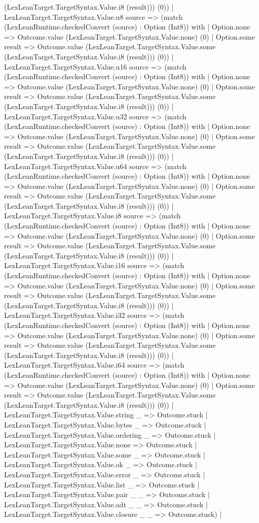\documentclass[11pt]{article}
\begin{document}
(LexLeanTarget.TargetSyntax.Value.i8 (result))) (0)) | LexLeanTarget.TargetSyntax.Value.u8 source => (match (LexLeanRuntime.checkedConvert (source) : Option (Int8)) with | Option.none => Outcome.value (LexLeanTarget.TargetSyntax.Value.none) (0) | Option.some result => Outcome.value (LexLeanTarget.TargetSyntax.Value.some (LexLeanTarget.TargetSyntax.Value.i8 (result))) (0)) | LexLeanTarget.TargetSyntax.Value.u16 source => (match (LexLeanRuntime.checkedConvert (source) : Option (Int8)) with | Option.none => Outcome.value (LexLeanTarget.TargetSyntax.Value.none) (0) | Option.some result => Outcome.value (LexLeanTarget.TargetSyntax.Value.some (LexLeanTarget.TargetSyntax.Value.i8 (result))) (0)) | LexLeanTarget.TargetSyntax.Value.u32 source => (match (LexLeanRuntime.checkedConvert (source) : Option (Int8)) with | Option.none => Outcome.value (LexLeanTarget.TargetSyntax.Value.none) (0) | Option.some result => Outcome.value (LexLeanTarget.TargetSyntax.Value.some (LexLeanTarget.TargetSyntax.Value.i8 (result))) (0)) | LexLeanTarget.TargetSyntax.Value.u64 source => (match (LexLeanRuntime.checkedConvert (source) : Option (Int8)) with | Option.none => Outcome.value (LexLeanTarget.TargetSyntax.Value.none) (0) | Option.some result => Outcome.value (LexLeanTarget.TargetSyntax.Value.some (LexLeanTarget.TargetSyntax.Value.i8 (result))) (0)) | LexLeanTarget.TargetSyntax.Value.i8 source => (match (LexLeanRuntime.checkedConvert (source) : Option (Int8)) with | Option.none => Outcome.value (LexLeanTarget.TargetSyntax.Value.none) (0) | Option.some result => Outcome.value (LexLeanTarget.TargetSyntax.Value.some (LexLeanTarget.TargetSyntax.Value.i8 (result))) (0)) | LexLeanTarget.TargetSyntax.Value.i16 source => (match (LexLeanRuntime.checkedConvert (source) : Option (Int8)) with | Option.none => Outcome.value (LexLeanTarget.TargetSyntax.Value.none) (0) | Option.some result => Outcome.value (LexLeanTarget.TargetSyntax.Value.some (LexLeanTarget.TargetSyntax.Value.i8 (result))) (0)) | LexLeanTarget.TargetSyntax.Value.i32 source => (match (LexLeanRuntime.checkedConvert (source) : Option (Int8)) with | Option.none => Outcome.value (LexLeanTarget.TargetSyntax.Value.none) (0) | Option.some result => Outcome.value (LexLeanTarget.TargetSyntax.Value.some (LexLeanTarget.TargetSyntax.Value.i8 (result))) (0)) | LexLeanTarget.TargetSyntax.Value.i64 source => (match (LexLeanRuntime.checkedConvert (source) : Option (Int8)) with | Option.none => Outcome.value (LexLeanTarget.TargetSyntax.Value.none) (0) | Option.some result => Outcome.value (LexLeanTarget.TargetSyntax.Value.some (LexLeanTarget.TargetSyntax.Value.i8 (result))) (0)) | LexLeanTarget.TargetSyntax.Value.string \_ => Outcome.stuck | LexLeanTarget.TargetSyntax.Value.bytes \_ => Outcome.stuck | LexLeanTarget.TargetSyntax.Value.ordering \_ => Outcome.stuck | LexLeanTarget.TargetSyntax.Value.none => Outcome.stuck | LexLeanTarget.TargetSyntax.Value.some \_ => Outcome.stuck | LexLeanTarget.TargetSyntax.Value.ok \_ => Outcome.stuck | LexLeanTarget.TargetSyntax.Value.error \_ => Outcome.stuck | LexLeanTarget.TargetSyntax.Value.list \_ => Outcome.stuck | LexLeanTarget.TargetSyntax.Value.pair \_ \_ => Outcome.stuck | LexLeanTarget.TargetSyntax.Value.adt \_ \_ => Outcome.stuck | LexLeanTarget.TargetSyntax.Value.closure \_ \_ => Outcome.stuck) | 
\end{document}
